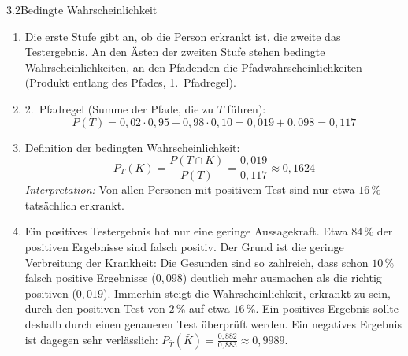 \begin{loesung}{3.2}{Bedingte Wahrscheinlichkeit}
\begin{enumerate}[label=\alph*)]
  \item Die erste Stufe gibt an, ob die Person erkrankt ist, die zweite das Testergebnis. An den Ästen der zweiten Stufe stehen bedingte Wahrscheinlichkeiten, an den Pfadenden die Pfadwahrscheinlichkeiten (Produkt entlang des Pfades, 1.~Pfadregel).
  \begin{center}
  \end{center}
  \item 2.~Pfadregel (Summe der Pfade, die zu $T$ führen):
  \[P(T) = 0{,}02\cdot 0{,}95+0{,}98\cdot 0{,}10 = 0{,}019+0{,}098 = 0{,}117\]
  \item Definition der bedingten Wahrscheinlichkeit:
  \[P_T(K) = \dfrac{P(T\cap K)}{P(T)} = \dfrac{0{,}019}{0{,}117}\approx 0{,}1624\]
  \textit{Interpretation:} Von allen Personen mit positivem Test sind nur etwa $16\,\%$ tatsächlich erkrankt.
  \item Ein positives Testergebnis hat nur eine geringe Aussagekraft. Etwa $84\,\%$ der positiven Ergebnisse sind falsch positiv. Der Grund ist die geringe Verbreitung der Krankheit: Die Gesunden sind so zahlreich, dass schon $10\,\%$ falsch positive Ergebnisse ($0{,}098$) deutlich mehr ausmachen als die richtig positiven ($0{,}019$). Immerhin steigt die Wahrscheinlichkeit, erkrankt zu sein, durch den positiven Test von $2\,\%$ auf etwa $16\,\%$. Ein positives Ergebnis sollte deshalb durch einen genaueren Test überprüft werden. Ein negatives Ergebnis ist dagegen sehr verlässlich: $P_{\bar{T}}(\bar{K}) = \frac{0{,}882}{0{,}883}\approx 0{,}9989$.
\end{enumerate}
\end{loesung}

